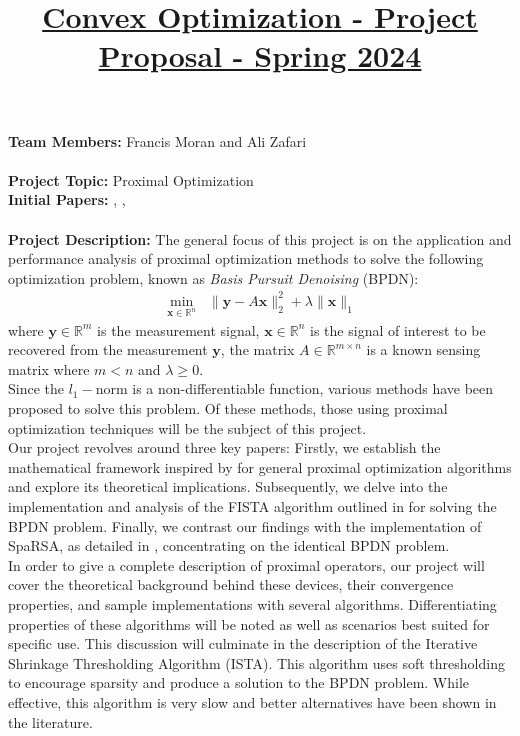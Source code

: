 \documentclass[a4paper]{article}
\title{\ul{Convex Optimization - Project Proposal - Spring 2024}
}
\author{
}
\date{}
\begin{document}
\maketitle

\noindent\textbf{Team Members:} Francis Moran and Ali Zafari\\\\
\textbf{Project Topic:} Proximal Optimization\\

\noindent\textbf{Initial Papers:}
\cite{parikh2014proximal}, \cite{beck2009fast}, \cite{wright2009sparse}\\\\

\noindent\textbf{Project Description:} The general focus of this project is on the application and performance analysis of proximal optimization methods to solve the following optimization problem, known as \textit{Basis Pursuit Denoising} (BPDN): 
\begin{align*}
    \min_{\mathbf{x}\in\mathbb{R}^n}\;\; \|\mathbf{y}-A\mathbf{x}\|_2^2+\lambda \|\mathbf{x}\|_1
\end{align*}
where $\mathbf{y}\in\mathbb{R}^m$ is the measurement signal, $\mathbf{x}\in \mathbb{R}^n$ is the signal of interest to be recovered from the measurement $\mathbf{y}$, the matrix $A\in\mathbb{R}^{m\times n}$ is a known sensing matrix where $m<n$ and $\lambda\geq0$.\\
Since the $l_1-$norm is a non-differentiable function, various methods have been proposed to solve this problem. Of these methods, those using proximal optimization techniques will be  the subject of this project.\\

Our project revolves around three key papers: Firstly, we establish the mathematical framework inspired by \cite{parikh2014proximal} for general proximal optimization algorithms and explore its theoretical implications. Subsequently, we delve into the implementation and analysis of the FISTA algorithm outlined in \cite{beck2009fast} for solving the BPDN problem. Finally, we contrast our findings with the implementation of SpaRSA, as detailed in \cite{wright2009sparse}, concentrating on the identical BPDN problem.\\

In order to give a complete description of proximal operators, our project will cover the theoretical background behind these devices, their convergence properties, and sample implementations with several algorithms. Differentiating properties of these algorithms will be noted as well as scenarios best suited for specific use. This discussion will culminate in the description of the Iterative Shrinkage Thresholding Algorithm (ISTA). This algorithm uses soft thresholding to encourage sparsity and produce a solution to the BPDN problem. While effective, this algorithm is very slow and better alternatives have been shown in the literature. \\
\end{document}
